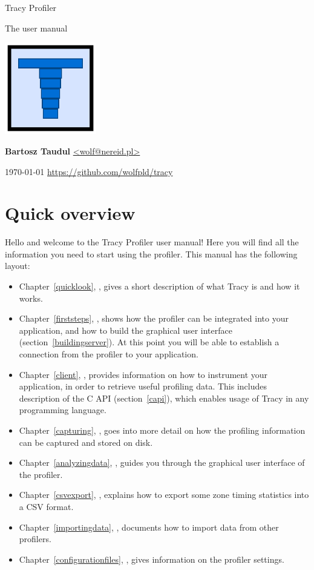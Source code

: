 \documentclass[hidelinks,titlepage,a4paper]{article}
\begin{document}
\begin{titlepage}
\centering
{\fontsize{120}{140}\selectfont Tracy Profiler}

\vspace{50pt} {\Huge{}\selectfont The user manual}

\vfill \includegraphics[height=40mm]{../icon/icon}

\vfill
\large\textbf{Bartosz Taudul} \href{mailto:wolf@nereid.pl}{<wolf@nereid.pl>}

\vspace{10pt}
\today
\vfill
\url{https://github.com/wolfpld/tracy}
\end{titlepage}

\section*{Quick overview}

Hello and welcome to the Tracy Profiler user manual! Here you will find all the information you need to start using the profiler. This manual has the following layout:

\begin{itemize}
\item Chapter~\ref{quicklook}, \emph{}, gives a short description of what Tracy is and how it works.
\item Chapter~\ref{firststeps}, \emph{}, shows how the profiler can be integrated into your application, and how to build the graphical user interface (section~\ref{buildingserver}). At this point you will be able to establish a connection from the profiler to your application.
\item Chapter~\ref{client}, \emph{}, provides information on how to instrument your application, in order to retrieve useful profiling data. This includes description of the C API (section~\ref{capi}), which enables usage of Tracy in any programming language.
\item Chapter~\ref{capturing}, \emph{}, goes into more detail on how the profiling information can be captured and stored on disk.
\item Chapter~\ref{analyzingdata}, \emph{}, guides you through the graphical user interface of the profiler.
\item Chapter~\ref{csvexport}, \emph{}, explains how to export some zone timing statistics into a CSV format.
\item Chapter~\ref{importingdata}, \emph{}, documents how to import data from other profilers.
\item Chapter~\ref{configurationfiles}, \emph{}, gives information on the profiler settings.
\end{itemize}
\end{document}
